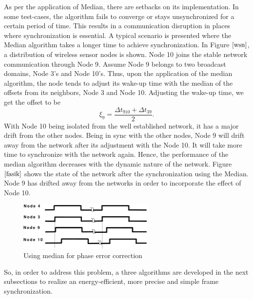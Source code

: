 \documentclass[a4paper,10pt]{report}
\begin{document}
\newline As per the application of Median, there are setbacks on its implementation. In some test-cases, the algorithm fails to converge or stays unsynchronized for a certain period of time. This results in a  communication disruption in places where synchronization is essential.
\newline A typical scenario is presented where the Median algorithm takes a longer time to achieve synchronization. In Figure
$\ref{wsn}$, a distribution of wireless sensor nodes is shown. Node 10 joins the stable network communication through Node 9. Assume Node
9 belongs to two broadcast domains, Node 3's and Node 10's. Thus, upon the application of the median algorithm, the node tends to
adjust its wake-up time with the median of the offsets from its neighbors, Node 3 and Node 10. Adjusting the wake-up time, we get
the offset to be 
\begin{equation}
\xi_9 = \frac{\Delta t_{910} + \Delta t_{39}}{2}.
\end{equation}
With Node 10 being isolated from the well established network, it has a major drift from the other nodes. Being in sync
with the other nodes, Node 9 will drift away from the network after its adjustment with the Node 10. It will take more time to
synchronize with the network again. Hence, the performance of the median algorithm decreases with the dynamic nature of the network.
Figure $\ref{fasik}$ shows the state of the network after the synchronization using the Median. Node 9 has drifted away from the
networks in order to incorporate the effect of Node 10.
\begin{figure}
\centering
\includegraphics[width= 0.6\textwidth]{offsetpic}
\caption{Using median for phase error correction} \label{fasik}
\end{figure}
\newline 
So, in order to address this problem, a three algorithms are developed in the next subsections to realize an energy-efficient, more precise and simple frame synchronization.\newline
\end{document}
